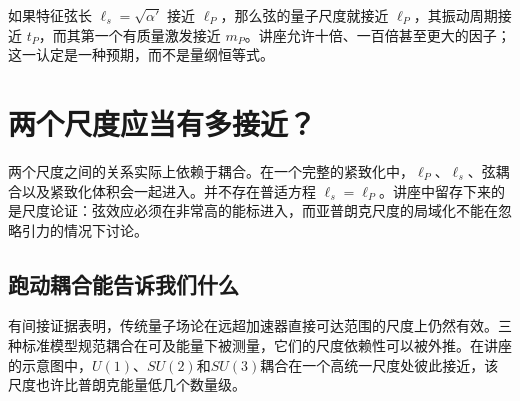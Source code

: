 如果特征弦长 \(\ell_s=\sqrt{\alpha'}\) 接近 \(\ell_P\)，那么弦的量子尺度就接近 \(\ell_P\)，其振动周期接近 \(t_P\)，而其第一个有质量激发接近 \(m_P\)。讲座允许十倍、一百倍甚至更大的因子；这一认定是一种预期，而不是量纲恒等式。

\begin{classroomqa}
\end{classroomqa}

\section{两个尺度应当有多接近？}

\begin{classroomqa}
\end{classroomqa}

两个尺度之间的关系实际上依赖于耦合。在一个完整的紧致化中，\(\ell_P\)、\(\ell_s\)、弦耦合以及紧致化体积会一起进入。并不存在普适方程 \(\ell_s=\ell_P\)。讲座中留存下来的是尺度论证：弦效应必须在非常高的能标进入，而亚普朗克尺度的局域化不能在忽略引力的情况下讨论。

\begin{classroomqa}
\end{classroomqa}

\subsection{跑动耦合能告诉我们什么}

有间接证据表明，传统量子场论在远超加速器直接可达范围的尺度上仍然有效。三种标准模型规范耦合在可及能量下被测量，它们的尺度依赖性可以被外推。在讲座的示意图中，\(U(1)\)、\(SU(2)\)和\(SU(3)\)耦合在一个高统一尺度处彼此接近，该尺度也许比普朗克能量低几个数量级。

